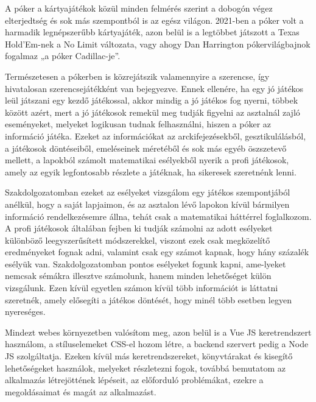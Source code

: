 
A póker a kártyajátékok közül minden felmérés szerint a dobogón végez elterjedtség és sok más szempontból is az egész világon. 2021-ben a póker volt a harmadik legnépszerűbb kártyajáték, azon belül is a legtöbbet játszott a Texas Hold’Em-nek a No Limit változata, vagy ahogy Dan Harrington pókervilágbajnok fogalmaz „a póker Cadillac-je”. 

Természetesen a pókerben is közrejátszik valamennyire a szerencse, így hivatalosan szerencsejátékként van bejegyezve. Ennek ellenére, ha egy jó játékos leül játszani egy kezdő játékossal, akkor mindig a jó játékos fog nyerni, többek között azért, mert a jó játékosok remekül meg tudják figyelni az asztalnál zajló eseményeket, melyeket logikusan tudnak felhasználni, hiszen a póker az információ játéka. Ezeket az információkat az arckifejezésekből, gesztikulálásból, a játékosok döntéseiből, emeléseinek méretéből és sok más egyéb öszszetevő mellett, a lapokból számolt matematikai esélyekből nyerik a profi játékosok, amely az egyik legfontosabb részlete a játéknak, ha sikeresek szeretnénk lenni.

Szakdolgozatomban ezeket az esélyeket vizsgálom egy játékos szempontjából anélkül, hogy a saját lapjaimon, és az asztalon lévő lapokon kívül bármilyen információ rendelkezésemre állna, tehát csak a matematikai háttérrel foglalkozom. A profi játékosok általában fejben ki tudják számolni az adott esélyeket különböző leegyszerűsített módszerekkel, viszont ezek csak megközelítő eredményeket fognak adni, valamint csak egy számot kapnak, hogy hány százalék esélyük van. Szakdolgozatomban pontos esélyeket fogunk kapni, ame-lyeket nemcsak sémákra illesztve számolunk, hanem minden lehetőséget külön vizsgálunk. Ezen kívül egyetlen számon kívül több információt is láttatni szeretnék, amely elősegíti a játékos döntését, hogy minél több esetben legyen nyereséges.

Mindezt webes környezetben valósítom meg, azon belül is a Vue JS keretrendszert használom, a stíluselemeket CSS-el hozom létre, a backend szervert pedig a Node JS szolgáltatja. Ezeken kívül más keretrendszereket, könyvtárakat és kisegítő lehetőségeket használok, melyeket részletezni fogok, továbbá bemutatom az alkalmazás létrejöttének lépéseit, az előforduló problémákat, ezekre a megoldásaimat és magát az alkalmazást. 
